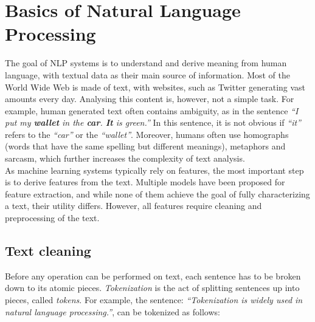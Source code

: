 \section{Basics of Natural Language Processing}\label{sec:NLP}
The goal of NLP systems is to understand and derive meaning from human language, with textual data as their main source of information.
Most of the World Wide Web is made of text, with websites, such as Twitter generating vast amounts every day. Analysing this content is, however, not a simple task. For example, human generated text often contains ambiguity, as in the sentence \emph{``I put my \textbf{wallet} in the  \textbf{car}.  \textbf{It} is green.''} In this sentence, it is not obvious if \emph{``it''} refers to the \emph{``car''} or the  \emph{``wallet''}. Moreover, humans often use homographs (words that have the same spelling but different meanings), metaphors and sarcasm, which further increases the complexity of text analysis.\\
As machine learning systems typically rely on features, the most important step is to derive features from the text. Multiple models have been proposed for feature extraction, and while none of them achieve the goal of fully characterizing a text, their utility differs.
%
However, all features require cleaning and preprocessing of the text. 

\subsection{Text cleaning}\label{subsec:cleaning}
Before any operation can be performed on text, each sentence has to be broken down to its atomic pieces. \emph{Tokenization} is the act of splitting sentences up into pieces, called \emph{tokens}. For example, the sentence: \emph{``Tokenization is widely used in natural language processing.''}, can be tokenized as follows:\\

